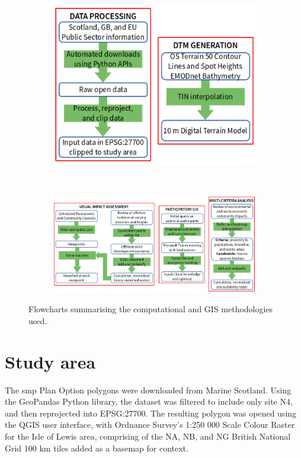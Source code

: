 \begin{figure}
  \centering
  \begin{subfigure}[t]{.96\textwidth}
    \centering
    \includegraphics[scale=.6]{images/flowchart1}
  \end{subfigure}
  \\
  \begin{subfigure}[t]{.96\textwidth}
    \centering
    \includegraphics[scale=.6]{images/flowchart2}
  \end{subfigure}
  \caption{Flowcharts summarising the computational and GIS methodologies used. \label{fig:flowcharts}}
\end{figure}

\section{Study area}

The \gls{smp} Plan Option polygons were downloaded from Marine Scotland. Using the GeoPandas Python library, the dataset was filtered to include only site N4, and then reprojected into EPSG:27700. The resulting polygon was opened using the QGIS user interface, with Ordnance Survey's 1:250 000 Scale Colour Raster for the Isle of Lewis area, comprising of the NA, NB, and NG British National Grid 100 km tiles added as a basemap for context.

